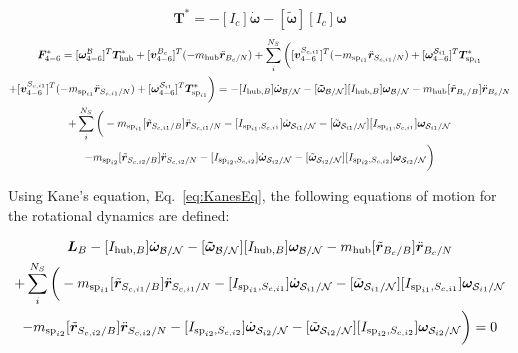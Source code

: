 \documentclass[paper]{aiaaNew}
\begin{document}
\begin{equation}
\bm T^* = -[I_c] \dot{\bm\omega}  -[\bm{\tilde{\omega}}] [I_c] \bm\omega
\end{equation}
\begin{multline}
\bm F^*_{4-6} = [\bm \omega_{4-6}^{\cal{B}}]^T \bm T^*_{\text{hub}} + [\bm v^{B_c}_{4-6}]^T (-m_{\text{hub}} \ddot{\bm r}_{B_c/N}) + \sum\limits_{i}^{N_S}\bigg([\bm v^{S_{c,i1}}_{4-6}]^T (-m_{\text{sp}_{i1}} \ddot{\bm{r}}_{S_{c,{i1}}/N}) + [\bm \omega_{4-6}^{\mathcal{S}_{i1}}]^T \bm T^*_{\text{sp}_{i1}} \\
+ [\bm v^{S_{c,i1}}_{4-6}]^T (-m_{\text{sp}_{i1}} \ddot{\bm{r}}_{S_{c,{i1}}/N}) + [\bm \omega_{4-6}^{\mathcal{S}_{i1}}]^T \bm T^*_{\text{sp}_{i1}}\bigg) 
= -[I_{\text{hub},B}] \dot{\bm\omega}_{\cal B/N}  -[\bm{\tilde{\omega}}_{\cal B/N}] [I_{\text{hub},B}] \bm\omega_{\cal B/N} - m_{\text{hub}} [\tilde{{\bm r}}_{B_c/B}] \ddot{\bm r}_{B_c/N} \\
+ \sum\limits_{i}^{N_S}\bigg(- m_{\text{sp}_{i1}} [\tilde{{\bm r}}_{S_{c,i1}/B}] \ddot{\bm r}_{S_{c,i1}/N} -[I_{\text{sp}_{i1},S_{c,i1}}] \dot{\bm\omega}_{\mathcal{S}_{i1}/\mathcal{N}}  -[\tilde{\bm \omega}_{\mathcal{S}_{i1}/\mathcal{N}}] [I_{\text{sp}_{i1},S_{c,i1}}] \bm \omega_{\mathcal{S}_{i1}/\mathcal{N}}\\
- m_{\text{sp}_{i2}} [\tilde{{\bm r}}_{S_{c,i2}/B}] \ddot{\bm r}_{S_{c,i2}/N} -[I_{\text{sp}_{i2},S_{c,i2}}] \dot{\bm\omega}_{\mathcal{S}_{i2}/\mathcal{N}}  -[\tilde{\bm \omega}_{\mathcal{S}_{i2}/\mathcal{N}}] [I_{\text{sp}_{i2},S_{c,i2}}] \bm \omega_{\mathcal{S}_{i2}/\mathcal{N}}\bigg)
\end{multline}

Using Kane's equation, Eq.~\eqref{eq:KanesEq}, the following equations of motion for the rotational dynamics are defined:

\begin{multline}
\bm L_B -[I_{\text{hub},B}] \dot{\bm\omega}_{\cal B/N}  -[\bm{\tilde{\omega}}_{\cal B/N}] [I_{\text{hub},B}] \bm\omega_{\cal B/N} - m_{\text{hub}} [\tilde{{\bm r}}_{B_c/B}] \ddot{\bm r}_{B_c/N} \\
+ \sum\limits_{i}^{N_S}\bigg(- m_{\text{sp}_{i1}} [\tilde{{\bm r}}_{S_{c,i1}/B}] \ddot{\bm r}_{S_{c,i1}/N} -[I_{\text{sp}_{i1},S_{c,i1}}] \dot{\bm\omega}_{\mathcal{S}_{i1}/\mathcal{N}}  -[\tilde{\bm \omega}_{\mathcal{S}_{i1}/\mathcal{N}}] [I_{\text{sp}_{i1},S_{c,i1}}] \bm \omega_{\mathcal{S}_{i1}/\mathcal{N}}\\
- m_{\text{sp}_{i2}} [\tilde{{\bm r}}_{S_{c,i2}/B}] \ddot{\bm r}_{S_{c,i2}/N} -[I_{\text{sp}_{i2},S_{c,i2}}] \dot{\bm\omega}_{\mathcal{S}_{i2}/\mathcal{N}}  -[\tilde{\bm \omega}_{\mathcal{S}_{i2}/\mathcal{N}}] [I_{\text{sp}_{i2},S_{c,i2}}] \bm \omega_{\mathcal{S}_{i2}/\mathcal{N}}\bigg) = 0
\end{multline}
\end{document}
